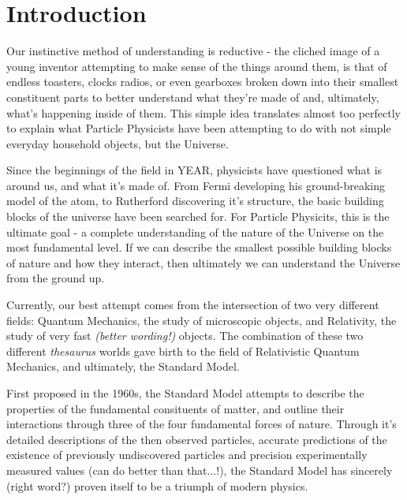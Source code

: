 
\chapter{Introduction}  %

\ifpdf
    \graphicspath{{Chapter1/Figs/Raster/}{Chapter1/Figs/PDF/}{Chapter1/Figs/}}
\else
    \graphicspath{{Chapter1/Figs/Vector/}{Chapter1/Figs/}}
\fi


\label{sec:introduction_intro}

Our instinctive method of understanding is reductive - the cliched image of a
young inventor attempting to make sense of the things around them, is
that of endless toasters, clocks radios, or even gearboxes broken down into
their smallest constituent parts to better understand what they're made of and,
ultimately, what's happening inside of them. This simple idea translates almost
too perfectly to explain what Particle Physicists have been attempting to do
with not simple everyday household objects, but the Universe.

Since the beginnings of the field in YEAR, physicists have questioned
what is
around us, and what it's made of. From Fermi developing his ground-breaking
model of the atom, to Rutherford discovering it's structure, the basic building
blocks of the universe have been searched for. For Particle Physicits, this is
the ultimate goal - a complete understanding of the nature of the Universe on
the most
fundamental level. If we can describe the smallest possible building blocks of
nature and how they interact, then ultimately we can understand
the Universe from the ground up.

Currently, our best attempt comes from the intersection of two very different
fields: Quantum Mechanics, the study of microscopic objects, and Relativity, the
study of very fast \emph{(better wording!)} objects. The combination of these
two different \emph{thesaurus} worlds gave birth to the field of Relativistic
Quantum Mechanics, and ultimately, the Standard Model.

First proposed in the 1960s, the Standard Model attempts to describe the
properties of the fundamental consituents of matter, and outline their
interactions through three of the four fundamental forces of nature. Through
it's detailed descriptions of the then observed particles,
accurate predictions of the existence of previously undiscovered particles and
precision experimentally measured values (can do better than that...!), the
Standard Model has sincerely (right word?) proven itself to be a triumph of
modern physics.

